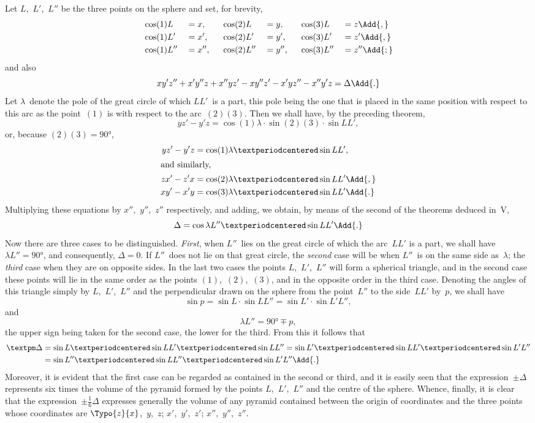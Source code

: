  Let $L$,~$L'$,~$L''$ be the three points on the sphere and set, for brevity,
\begin{alignat*}{6}
&\cos (1)L   &&= x,\quad&& \cos (2)L   &&= y,\quad&& \cos (3)L   &&= z\Add{,} \\
&\cos (1)L'  &&= x',    && \cos (2)L'  &&= y',    && \cos (3)L'  &&= z'\Add{,} \\
&\cos (1)L'' &&= x'',   && \cos (2)L'' &&= y'',   && \cos (3)L'' &&= z''\Add{;} \\
\end{alignat*}
and also
\[
x y' z'' + x' y'' z + x'' y z' - x y'' z' - x' y z'' - x'' y' z = \Delta\Add{.}
\]
Let $\lambda$~denote the pole of the great circle of which $LL'$~is a part, this pole being the one
that is placed in the same position with respect to this arc as the point~$(1)$ is with
respect to the arc~$(2)(3)$. Then we shall have, by the preceding theorem,
\[
y z' - y' z = \cos (1)\lambda·\sin (2)(3)·\sin LL',
\]
or, because $(2)(3) = 90°$,
\begin{align*}
y z' - y' z &= \cos (1)\lambda·\sin LL', \\
\intertext{and similarly,}
z x' - z' x &= \cos (2)\lambda·\sin LL'\Add{,} \\
x y' - x' y &= \cos (3)\lambda·\sin LL'\Add{.}
\end{align*}
Multiplying these equations by $x''$,~$y''$,~$z''$ respectively, and adding, we obtain, by means
of the second of the theorems deduced in~V,
\[
\Delta = \cos \lambda L''·\sin LL'\Add{.}
\]
Now there are three cases to be distinguished. \emph{First}, when $L''$~lies on the great circle
of which the arc~$LL'$ is a part, we shall have $\lambda L'' = 90°$, and consequently, $\Delta = 0$.
If $L''$~does not lie on that great circle, the \emph{second} case will be when $L''$~is on the same
side as~$\lambda$; the \emph{third} case when they are on opposite sides. In the last two cases the
points $L$,~$L'$,~$L''$ will form a spherical triangle, and in the second case these points will lie
in the same order as the points $(1)$,~$(2)$,~$(3)$, and in the opposite order in the third case.
Denoting the angles of this triangle simply by $L$,~$L'$,~$L''$ and the perpendicular drawn on
the sphere from the point~$L''$ to the side~$LL'$ by~$p$, we shall have
\[
\sin p = \sin L·\sin LL'' = \sin L'·\sin L' L'',
\]
and
\[
\lambda L'' = 90° \mp p,
\]
the upper sign being taken for the second case, the lower for the third. From this
it follows that
\begin{align*}
±\Delta &= \sin L·\sin LL'·\sin LL''
   = \sin L'·\sin LL'·\sin L'L'' \\
  &= \sin L''·\sin LL''·\sin L'L''\Add{.}
\end{align*}
Moreover, it is evident that the first case can be regarded as contained in the second or
third, and it is easily seen that the expression~$±\Delta$ represents six times the volume of
the pyramid formed by the points $L$,~$L'$,~$L''$ and the centre of the sphere. Whence,
finally, it is clear that the expression~$±\frac{1}{6}\Delta$ expresses generally the volume of any
pyramid contained between the origin of coordinates and the three points whose coordinates
are $\Typo{z}{x}$,~$y$,~$z$; $x'$,~$y'$,~$z'$; $x''$,~$y''$,~$z''$.


